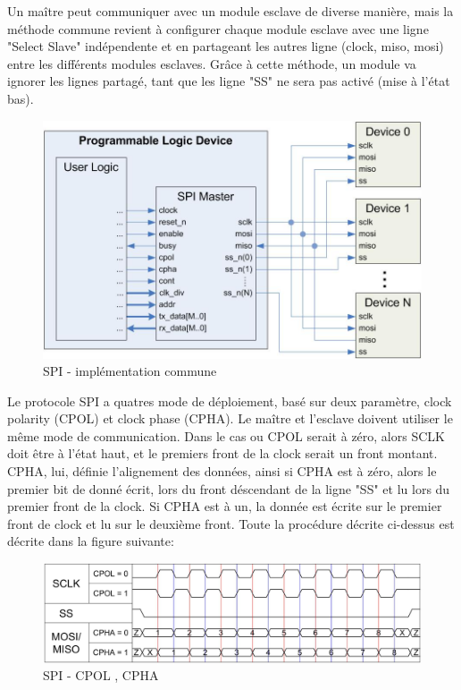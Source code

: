 \documentclass[french,a4paper,12pt]{report}
\begin{document}
			Un maître peut communiquer avec un module esclave de diverse manière, mais la méthode commune revient à configurer chaque module esclave avec une ligne "Select Slave" indépendente et en partageant les autres ligne (clock, miso, mosi) entre les différents modules esclaves. Grâce à cette méthode, un module va ignorer les lignes partagé, tant que les ligne "SS" ne sera pas activé (mise à l'état bas).
			
	\begin{figure}[!ht]
    \center
  	\includegraphics[width=15cm]{spi_master_block.JPG}
    \caption{SPI - implémentation commune}
	\end{figure}
	
	Le protocole SPI a quatres mode de déploiement, basé sur deux paramètre, clock polarity (CPOL) et clock phase (CPHA). Le maître et l'esclave doivent utiliser le même mode de communication. 
	Dans le cas ou CPOL serait à zéro, alors SCLK doit être à l'état haut, et le premiers front de la clock serait un front montant.
	CPHA, lui, définie l'alignement des données, ainsi si CPHA est à zéro, alors le premier bit de donné écrit, lors du front déscendant de la ligne "SS" et lu lors du premier front de la clock. Si CPHA est à un, la donnée est écrite sur le premier front de clock et lu sur le deuxième front.
	Toute la procédure décrite ci-dessus est décrite dans la figure suivante:
	
	\begin{figure}[!ht]
    \center
  	\includegraphics[width=15cm]{spi_timing_diagram.JPG}
    \caption{SPI - CPOL , CPHA}
	\end{figure}
	
\end{document}
